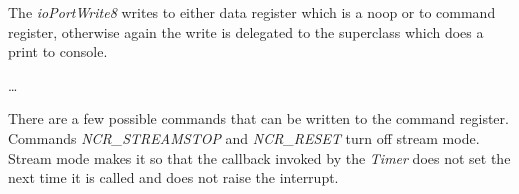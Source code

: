 The \emph{ioPortWrite8} writes to either data register which is a noop or to
command register, otherwise again the write is delegated to the superclass
which does a print to console.

\begin{codeblock}
    
    \dots
    
\end{codeblock}


There are a few possible commands that can be written to the command register.
Commands \emph{NCR\_STREAMSTOP} and \emph{{NCR\_RESET}} turn off stream mode.
Stream mode makes it so that the callback invoked by the \emph{Timer} does not
set the next time it is called and does not raise the interrupt.

\begin{codeblock}
    
\end{codeblock}

%

